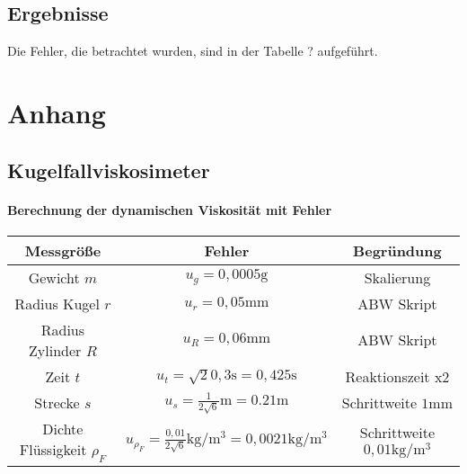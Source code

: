 \documentclass[11pt, a4paper]{article}
\begin{document}
    \subsection{Ergebnisse}

    Die Fehler, die betrachtet wurden, sind in der Tabelle ? aufgeführt.



    \section{Anhang}
    \subsection{Kugelfallviskosimeter}

    \paragraph{Berechnung der dynamischen Viskosität mit Fehler}
    
    \begin{table}
       \begin{adjustwidth}{-5cm}{-5cm}
            \centering
            \begin{tabular}{c c c}
                Messgröße & Fehler & Begründung \\ \hline
                Gewicht $m$ & $u_g = 0,0005 \si{\gram}$ & Skalierung \\
                Radius Kugel $r$ & $u_r = 0,05 \si{\milli\meter}$ & ABW Skript \cite[Tabelle 6]{ABW} \\
                Radius Zylinder $R$ & $u_R = 0,06 \si{\milli\meter}$ & ABW Skript \cite[Tabelle 6]{ABW} \\
                Zeit $t$ & $u_t = \sqrt{2} 0,3\si{\second} = 0,425 \si{\second}$ & Reaktionszeit x2\\
                Strecke $s$ & $u_s = \frac{1}{2\sqrt{6}} \si{\metre} = 0.21 \si{\metre}$ & Schrittweite $1 \si{\milli\metre}$ \\
                Dichte Flüssigkeit $\rho_F$ & $u_{\rho_F} = \frac{0,01}{2\sqrt{6}} \si{\kilogram\per\cubic\metre} = 0,0021  \si{\kilogram\per\cubic\metre}$ & Schrittweite $0,01 \si{\kilogram\per\cubic\metre}$ \\

            \end{tabular}
        \end{adjustwidth}
    \end{table}
    
\end{document}
